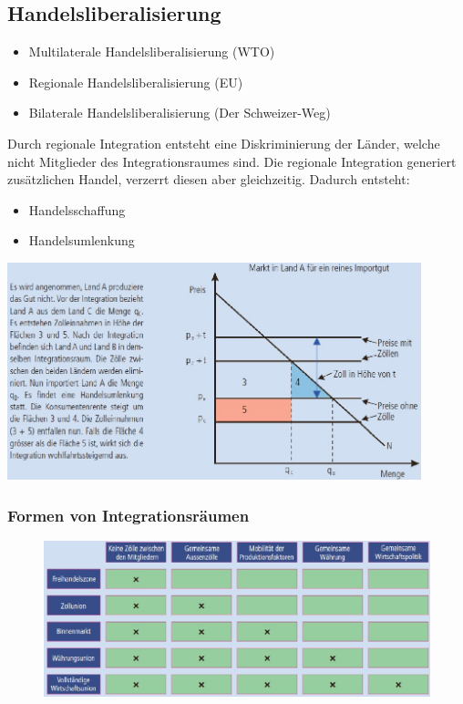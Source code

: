 \subsection{Handelsliberalisierung}
\begin{minipage}{7cm}
	\begin{itemize}
		\item Multilaterale Handelsliberalisierung (WTO)
		\item Regionale Handelsliberalisierung (EU)
		\item Bilaterale Handelsliberalisierung (Der Schweizer-Weg)
	\end{itemize}
	Durch regionale Integration entsteht eine Diskriminierung der Länder, welche nicht Mitglieder des Integrationsraumes sind. Die regionale Integration generiert zusätzlichen Handel, verzerrt diesen aber gleichzeitig. Dadurch entsteht: 
	\begin{itemize}
		\item Handelsschaffung
		\item Handelsumlenkung
	\end{itemize}
\end{minipage}
\begin{minipage}{12cm}
	\includegraphics[width=12cm]{images/integrationsraume.jpg}
\end{minipage}
\subsubsection{Formen von Integrationsräumen}
\begin{figure}[h]
	\centering
	\includegraphics[width=0.75\linewidth]{images/integrationsformen.jpg}
\end{figure}
